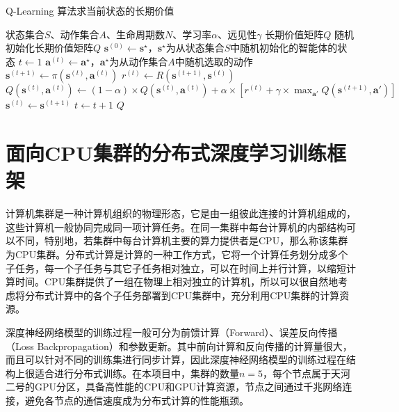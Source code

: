 \begin{algorithm}[!htb]
    \caption{Q-Learning 算法求当前状态的长期价值}
    \label{alg:qlearning}
    \begin{algorithmic}[1]
        \Require 状态集合$S$、动作集合$A$、生命周期数$N$、学习率$\alpha$、远见性$\gamma$
        \Ensure 长期价值矩阵$Q$
            \State 随机初始化长期价值矩阵$Q$
                \State $\boldsymbol{s}^{(0)}\gets\boldsymbol{s}^\star$，$\boldsymbol{s}^\star$为从状态集合$S$中随机初始化的智能体的状态
                \State $t\gets1$
                \Repeat
                    \State $\boldsymbol{a}^{(t)}\gets \boldsymbol{a}^\star$，$\boldsymbol{a}^\star$为从动作集合$A$中随机选取的动作
                    \State $\boldsymbol{s}^{(t+1)}\gets \pi\left(\boldsymbol{s}^{(t)}, \boldsymbol{a}^{(t)}\right)$
                    \State $r^{(t)}\gets R\left(\boldsymbol{s}^{(t+1)},\boldsymbol{s}^{(t)}\right)$
                    \State $Q\left(\boldsymbol{s}^{(t)},\boldsymbol{a}^{(t)}\right)\gets(1-\alpha)\times Q\left(\boldsymbol{s}^{(t)},\boldsymbol{a}^{(t)}\right)+\alpha\times\left[r^{(t)}+\gamma\times\max_{\boldsymbol{a}'}Q\left(\boldsymbol{s}^{(t+1)}, \boldsymbol{a}'\right)\right]$
                    \State $\boldsymbol{s}^{(t)}\gets\boldsymbol{s}^{(t+1)}$
                    \State $t\gets  t+1$
            \EndFor
            \State\Return $Q$
        \EndFunction
    \end{algorithmic}
\end{algorithm}

\section{面向CPU集群的分布式深度学习训练框架}

计算机集群是一种计算机组织的物理形态，它是由一组彼此连接的计算机组成的，这些计算机一般协同完成同一项计算任务。在同一集群中每台计算机的内部结构可以不同，特别地，若集群中每台计算机主要的算力提供者是CPU，那么称该集群为CPU集群。分布式计算是计算的一种工作方式，它将一个计算任务划分成多个子任务，每一个子任务与其它子任务相对独立，可以在时间上并行计算，以缩短计算时间。CPU集群提供了一组在物理上相对独立的计算机，所以可以很自然地考虑将分布式计算中的各个子任务部署到CPU集群中，充分利用CPU集群的计算资源。

深度神经网络模型的训练过程一般可分为前馈计算（Forward）、误差反向传播（Loss Backpropagation）和参数更新。其中前向计算和反向传播的计算量很大，而且可以针对不同的训练集进行同步计算，因此深度神经网络模型的训练过程在结构上很适合进行分布式训练。在本项目中，集群的数量$n=5$，每个节点属于天河二号的GPU分区，具备高性能的CPU和GPU计算资源，节点之间通过千兆网络连接，避免各节点的通信速度成为分布式计算的性能瓶颈。

